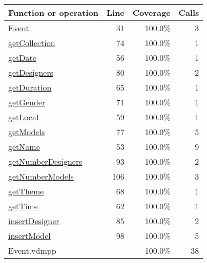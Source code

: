 \begin{longtable}{|l|r|r|r|}
\hline
Function or operation & Line & Coverage & Calls \\
\hline
\hline
\hyperref[Event:31]{Event} & 31&100.0\% & 3 \\
\hline
\hyperref[getCollection:74]{getCollection} & 74&100.0\% & 1 \\
\hline
\hyperref[getDate:56]{getDate} & 56&100.0\% & 1 \\
\hline
\hyperref[getDesigners:80]{getDesigners} & 80&100.0\% & 2 \\
\hline
\hyperref[getDuration:65]{getDuration} & 65&100.0\% & 1 \\
\hline
\hyperref[getGender:71]{getGender} & 71&100.0\% & 1 \\
\hline
\hyperref[getLocal:59]{getLocal} & 59&100.0\% & 1 \\
\hline
\hyperref[getModels:77]{getModels} & 77&100.0\% & 5 \\
\hline
\hyperref[getName:53]{getName} & 53&100.0\% & 9 \\
\hline
\hyperref[getNumberDesigners:93]{getNumberDesigners} & 93&100.0\% & 2 \\
\hline
\hyperref[getNumberModels:106]{getNumberModels} & 106&100.0\% & 3 \\
\hline
\hyperref[getTheme:68]{getTheme} & 68&100.0\% & 1 \\
\hline
\hyperref[getTime:62]{getTime} & 62&100.0\% & 1 \\
\hline
\hyperref[insertDesigner:85]{insertDesigner} & 85&100.0\% & 2 \\
\hline
\hyperref[insertModel:98]{insertModel} & 98&100.0\% & 5 \\
\hline
\hline
Event.vdmpp & & 100.0\% & 38 \\
\hline
\end{longtable}

